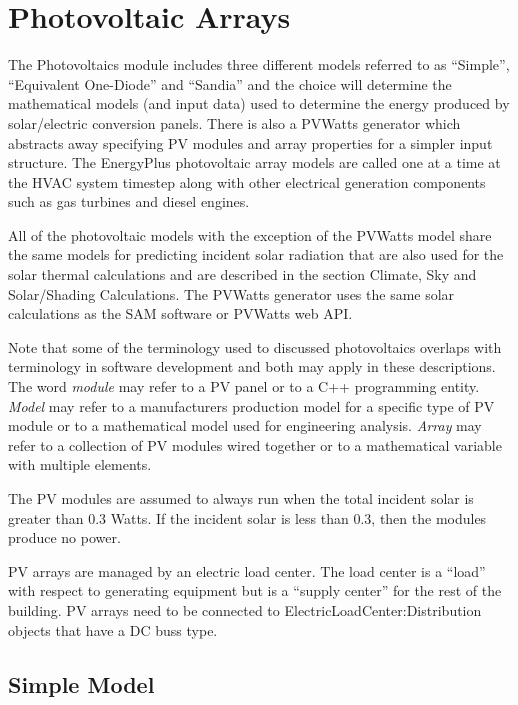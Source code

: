 \section{Photovoltaic Arrays}\label{photovoltaic-arrays}

The Photovoltaics module includes three different models referred to as ``Simple'', ``Equivalent One-Diode'' and ``Sandia'' and the choice will determine the mathematical models (and input data) used to determine the energy produced by solar/electric conversion panels. There is also a PVWatts generator which abstracts away specifying PV modules and array properties for a simpler input structure. The EnergyPlus photovoltaic array models are called one at a time at the HVAC system timestep along with other electrical generation components such as gas turbines and diesel engines.

All of the photovoltaic models with the exception of the PVWatts model share the same models for predicting incident solar radiation that are also used for the solar thermal calculations and are described in the section Climate, Sky and Solar/Shading Calculations. The PVWatts generator uses the same solar calculations as the SAM software or PVWatts web API. 

Note that some of the terminology used to discussed photovoltaics overlaps with terminology in software development and both may apply in these descriptions. The word \emph{module} may refer to a PV panel or to a C++ programming entity. \emph{Model} may refer to a manufacturers production model for a specific type of PV module or to a mathematical model used for engineering analysis. \emph{Array} may refer to a collection of PV modules wired together or to a mathematical variable with multiple elements.

The PV modules are assumed to always run when the total incident solar is greater than 0.3 Watts. If the incident solar is less than 0.3, then the modules produce no power.

PV arrays are managed by an electric load center. The load center is a ``load'' with respect to generating equipment but is a ``supply center'' for the rest of the building. PV arrays need to be connected to ElectricLoadCenter:Distribution objects that have a DC buss type.

\subsection{Simple Model}\label{simple-model}

